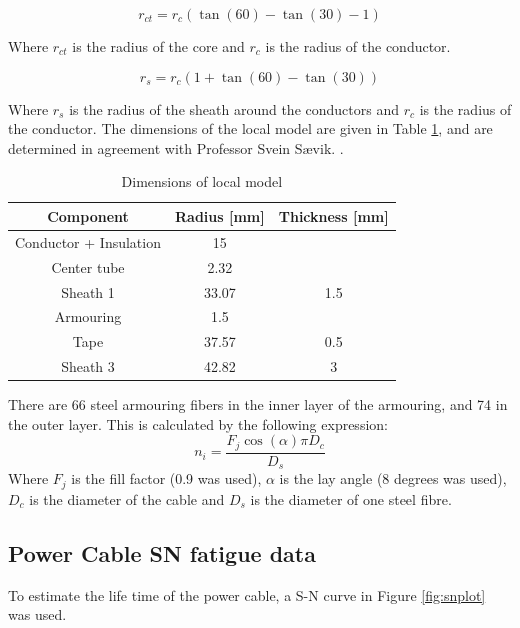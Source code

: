   \begin{equation}
   r_{ct} = r_c (\tan(60)-\tan(30)-1)
\end{equation}

 \noindent Where $r_{ct}$ is the radius of the core and $r_c$ is the radius of the conductor.

 \begin{equation}
   r_{s} = r_c (1+\tan(60)-\tan(30))
\end{equation}
 
  \noindent Where $r_{s}$ is the radius of the sheath around the conductors and $r_c$ is the radius of the conductor. \newline
  \newline 
  \noindent The dimensions of the local model are given in Table \ref{table:dim}, and are determined in agreement with Professor Svein Sævik. . 


\begin{table} [H]
\centering
\begin{tabular}{ |c|c|c|}
\hline
Component & Radius [mm] & Thickness [mm] \\
 \hline
 \hline
 Conductor + Insulation & 15 &\\

 Center tube & 2.32& \\
 
 Sheath 1 & 33.07 & 1.5 \\
 
Armouring & 1.5 &  \\

Tape & 37.57 & 0.5 \\

Sheath 3 & 42.82& 3  \\

 \hline
\end{tabular}
\caption{Dimensions of local model}
\label{table:dim}
\end{table} 

\noindent There are 66 steel armouring fibers in the inner layer of the armouring, and 74 in the outer layer. This is calculated by the following expression:
\begin{equation}
    n_i=\frac{F_j\cos(\alpha)\pi D_c}{D_s}
\end{equation}
Where $F_j$ is the fill factor (0.9 was used), $\alpha$ is the lay angle (8 degrees was used), $D_c$ is the diameter of the cable and $D_s$ is the diameter of one steel fibre. 
\subsection{Power Cable SN fatigue data}
To estimate the life time of the power cable, a S-N curve in Figure \ref{fig:snplot} was used. 

